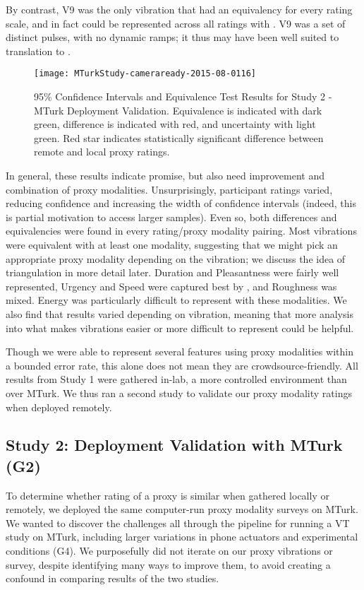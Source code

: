     By contrast, V9 was the only vibration that had an equivalency for every rating scale, and in fact could be represented across all ratings with \lofi.
    V9 was a set of distinct pulses, with no dynamic ramps; it thus may have been well suited to translation to \lofi.
    
\begin{figure*}[tb]
	\centering
	\texttt{[image: MTurkStudy-cameraready-2015-08-0116]}
	\caption{95\% Confidence Intervals and Equivalence Test Results for Study 2 - MTurk Deployment Validation. Equivalence is indicated with dark green, difference is indicated with red, and uncertainty with light green. Red star indicates statistically significant difference between remote and local proxy ratings. 
	}
	\label{fig:results:study2}
\end{figure*}

In general, these results indicate promise, but also need improvement and combination of proxy modalities.
Unsurprisingly, participant ratings varied, reducing confidence and increasing the width of confidence intervals (indeed, this is partial motivation to access larger samples). 
Even so, both differences and equivalencies were found in every rating/proxy modality pairing.
Most vibrations were equivalent with at least one modality, suggesting that we might pick an appropriate proxy modality depending on the vibration; we discuss the idea of triangulation in more detail later.
Duration and Pleasantness were fairly well represented, Urgency and Speed were captured best by \lofi, and Roughness was mixed.
Energy was particularly difficult to represent with these modalities.
We also find that results varied depending on vibration, meaning that more analysis into what makes vibrations easier or more difficult to represent could be helpful.

Though we were able to represent several features using proxy modalities within a bounded error rate, this alone does not mean they are crowdsource-friendly.
All results from Study 1 were gathered in-lab, a more controlled environment than over MTurk.
We thus ran a second study to validate our proxy modality ratings when deployed remotely.

\subsection{Study 2: Deployment Validation with MTurk (G2)}
To determine whether rating of a proxy is similar when gathered locally or remotely, we deployed the same computer-run proxy modality surveys on MTurk.
We wanted to discover the challenges all through the pipeline for running a VT study on MTurk, including larger variations in phone actuators and experimental conditions (G4). 
We purposefully did not iterate on our proxy vibrations or survey, despite identifying many ways to improve them, to avoid creating a confound in comparing results of the two studies. 

